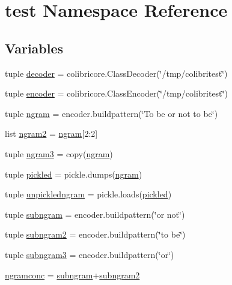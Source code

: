 \hypertarget{namespacetest}{}\section{test Namespace Reference}
\label{namespacetest}
\subsection*{Variables}
\begin{DoxyCompactItemize}
\item 
tuple \hyperlink{namespacetest_a315e1f1cdf594ddd88b3c64ac5a8d8ea}{decoder} = colibricore.\+Class\+Decoder(\char`\"{}/tmp/colibritest\char`\"{})
\item 
tuple \hyperlink{namespacetest_abcc44abf2a2645b488cdf35706e3f8dd}{encoder} = colibricore.\+Class\+Encoder(\char`\"{}/tmp/colibritest\char`\"{})
\item 
tuple \hyperlink{namespacetest_a172822b9b1b04a83c37863777d586d66}{ngram} = encoder.\+buildpattern(\char`\"{}To be or not to be\char`\"{})
\item 
list \hyperlink{namespacetest_a192953f02127a54653c24b19995e4ab5}{ngram2} = \hyperlink{namespacetest_a172822b9b1b04a83c37863777d586d66}{ngram}\mbox{[}2\+:2\mbox{]}
\item 
tuple \hyperlink{namespacetest_a16964a57a08015b96ec6a0a5571221c4}{ngram3} = copy(\hyperlink{namespacetest_a172822b9b1b04a83c37863777d586d66}{ngram})
\item 
tuple \hyperlink{namespacetest_ae0a947197ff98632dbd9b9202af2e9d4}{pickled} = pickle.\+dumps(\hyperlink{namespacetest_a172822b9b1b04a83c37863777d586d66}{ngram})
\item 
tuple \hyperlink{namespacetest_a3fd9766be745abf941fa498c963c65ca}{unpickledngram} = pickle.\+loads(\hyperlink{namespacetest_ae0a947197ff98632dbd9b9202af2e9d4}{pickled})
\item 
tuple \hyperlink{namespacetest_aebc4bce24c358f86be52bd0827e717e3}{subngram} = encoder.\+buildpattern(\char`\"{}or not\char`\"{})
\item 
tuple \hyperlink{namespacetest_a74ad1b92a76663226004d55408ff5336}{subngram2} = encoder.\+buildpattern(\char`\"{}to be\char`\"{})
\item 
tuple \hyperlink{namespacetest_a91d28841d2bda96a438e76d99dbe6294}{subngram3} = encoder.\+buildpattern(\char`\"{}or\char`\"{})
\item 
\hyperlink{namespacetest_aa28f4be90818659453cac8fac2589d39}{ngramconc} = \hyperlink{namespacetest_aebc4bce24c358f86be52bd0827e717e3}{subngram}+\hyperlink{namespacetest_a74ad1b92a76663226004d55408ff5336}{subngram2}

\end{DoxyCompactItemize}
